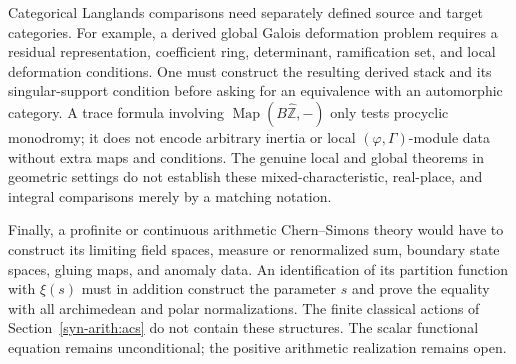 Categorical Langlands comparisons need separately defined source and
target categories.  For example, a derived global Galois deformation
problem requires a residual representation, coefficient ring, determinant,
ramification set, and local deformation conditions.  One must construct
the resulting derived stack and its singular-support condition before
asking for an equivalence with an automorphic category.
A trace formula involving $\operatorname{Map}(B\widehat{\mathbb Z},-)$
only tests procyclic monodromy; it does not encode arbitrary inertia or
local $(\varphi,\Gamma)$-module data without extra maps and conditions.
The genuine local and global theorems in geometric settings do not
establish these mixed-characteristic, real-place, and integral comparisons
merely by a matching notation.

Finally, a profinite or continuous arithmetic Chern--Simons theory would
have to construct its limiting field spaces, measure or renormalized sum,
boundary state spaces, gluing maps, and anomaly data.  An identification
of its partition function with $\xi(s)$ must in addition construct the
parameter $s$ and prove the equality with all archimedean and polar
normalizations.  The finite classical actions of
Section~\ref{syn-arith:acs} do not contain these structures.
The scalar functional equation remains unconditional; the positive
arithmetic realization remains open.
